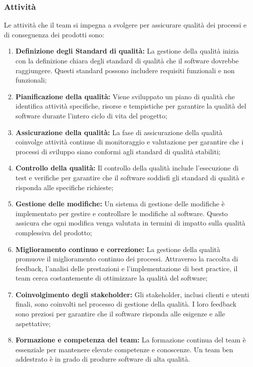 \subsubsection{Attività}
Le attività che il team si impegna a svolgere per assicurare qualità dei processi e di conseguenza dei prodotti sono:
\begin{enumerate}
    \item \textbf{Definizione degli Standard di qualità:}
        La gestione della qualità inizia con la definizione chiara degli standard di qualità che il software dovrebbe raggiungere. Questi standard possono includere requisiti funzionali e non funzionali;

    \item \textbf{Pianificazione della qualità:}
        Viene sviluppato un piano di qualità che identifica attività specifiche, risorse e tempistiche per garantire la qualità del software durante l'intero ciclo di vita del progetto;

    \item \textbf{Assicurazione della qualità:}
        La fase di assicurazione della qualità coinvolge attività continue di monitoraggio e valutazione per garantire che i processi di sviluppo siano conformi agli standard di qualità stabiliti;

    \item \textbf{Controllo della qualità:}
        Il controllo della qualità include l'esecuzione di test e verifiche per garantire che il software soddisfi gli standard di qualità e risponda alle specifiche richieste;

    \item \textbf{Gestione delle modifiche:}
        Un sistema di gestione delle modifiche è implementato per gestire e controllare le modifiche al software. Questo assicura che ogni modifica venga valutata in termini di impatto sulla qualità complessiva del prodotto;

    \item \textbf{Miglioramento continuo e correzione:}
        La gestione della qualità promuove il miglioramento continuo dei processi. Attraverso la raccolta di feedback, l'analisi delle prestazioni e l'implementazione di best practice, il team cerca costantemente di ottimizzare la qualità del software;

    \item \textbf{Coinvolgimento degli stakeholder:}
        Gli stakeholder, inclusi clienti e utenti finali, sono coinvolti nel processo di gestione della qualità. I loro feedback sono preziosi per garantire che il software risponda alle esigenze e alle aspettative;

    \item \textbf{Formazione e competenza del team:}
        La formazione continua del team è essenziale per mantenere elevate competenze e conoscenze. Un team ben addestrato è in grado di produrre software di alta qualità.
\end{enumerate}

